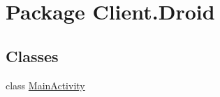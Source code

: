 \hypertarget{namespaceClient_1_1Droid}{\section{Package Client.\-Droid}
\label{namespaceClient_1_1Droid}
}
\subsection*{Classes}
\begin{DoxyCompactItemize}
\item 
class \hyperlink{classClient_1_1Droid_1_1MainActivity}{Main\-Activity}
\end{DoxyCompactItemize}
